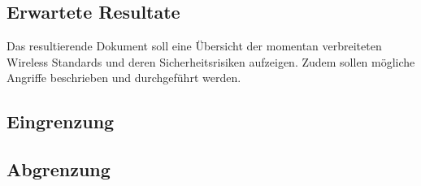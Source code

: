 \subsection{Erwartete Resultate}
Das resultierende Dokument soll eine Übersicht der momentan verbreiteten Wireless Standards und deren Sicherheitsrisiken aufzeigen.
Zudem sollen mögliche Angriffe beschrieben und durchgeführt werden.


\subsection{Eingrenzung}

\subsection{Abgrenzung}

